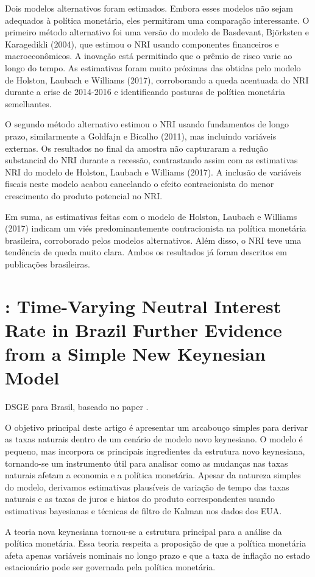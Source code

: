 Dois modelos alternativos foram estimados. Embora esses modelos não sejam adequados à política monetária, eles permitiram uma comparação interessante. O primeiro método alternativo foi uma versão do modelo de Basdevant, Björksten e Karagedikli (2004), que estimou o NRI usando componentes financeiros e macroeconômicos. A inovação está permitindo que o prêmio de risco varie ao longo do tempo. As estimativas foram muito próximas das obtidas pelo modelo de Holston, Laubach e Williams (2017), corroborando a queda acentuada do NRI durante a crise de 2014-2016 e identificando posturas de política monetária semelhantes.

O segundo método alternativo estimou o NRI usando fundamentos de longo prazo, similarmente a Goldfajn e Bicalho (2011), mas incluindo variáveis externas. Os resultados no final da amostra não capturaram a redução substancial do NRI durante a recessão, contrastando assim com as estimativas NRI do modelo de Holston, Laubach e Williams (2017). A inclusão de variáveis fiscais neste modelo acabou cancelando o efeito contracionista do menor crescimento do produto potencial no NRI.

Em suma, as estimativas feitas com o modelo de Holston, Laubach e Williams (2017) indicam um viés predominantemente contracionista na política monetária brasileira, corroborado pelos modelos alternativos. Além disso, o NRI teve uma tendência de queda muito clara. Ambos os resultados já foram descritos em publicações brasileiras.
%
%
\section{\citet{Palma:2017}: Time-Varying Neutral Interest Rate in Brazil Further Evidence from a Simple New Keynesian Model}
DSGE para Brasil, baseado no paper \citet{Bjornland:2011}.

O objetivo principal deste artigo é apresentar um arcabouço simples para derivar as taxas naturais dentro de um cenário de modelo novo keynesiano. O modelo é pequeno, mas incorpora os principais ingredientes da estrutura novo keynesiana, tornando-se um instrumento útil para analisar como as mudanças nas taxas naturais afetam a economia e a política monetária. Apesar da natureza simples do modelo, derivamos estimativas plausíveis de variação de tempo das taxas naturais e as taxas de juros e hiatos do produto correspondentes usando estimativas bayesianas e técnicas de filtro de Kalman nos dados dos EUA.

A teoria nova keynesiana tornou-se a estrutura principal para a análise da política monetária. Essa teoria respeita a proposição de que a política monetária afeta apenas variáveis nominais no longo prazo e que a taxa de inflação no estado estacionário pode ser governada pela política monetária.

